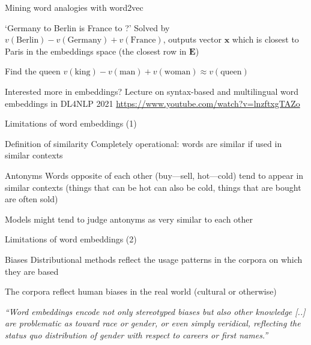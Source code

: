 \documentclass[12pt,aspectratio=169,handout]{beamer}
\begin{document}
\begin{frame}{Mining word analogies with word2vec}

\begin{block}{`Germany to Berlin is France to ?'}
Solved by $v(\text{Berlin}) - v(\text{Germany}) + v(\text{France})$, outputs vector $\bm{x}$ which is closest to Paris in the embeddings space (the closest row in $\bm{E}$)
\end{block}

\begin{block}{Find the queen}
$v(\text{king}) - v(\text{man}) + v(\text{woman}) \approx v(\text{queen})$
\end{block}

Interested more in embeddings? Lecture on syntax-based and multilingual word embeddings in DL4NLP 2021 \url{https://www.youtube.com/watch?v=lnzftxgTAZo}

\end{frame}

\begin{frame}{Limitations of word embeddings (1)}

\begin{block}{Definition of similarity}
Completely operational: words are similar if used in similar contexts
\end{block}

\begin{block}{Antonyms}
Words opposite of each other (buy---sell, hot---cold) tend to appear in similar contexts (things that can be hot can also be cold, things that are bought are often sold)

Models might tend to judge antonyms as very similar to each other
\end{block}

\end{frame}

\begin{frame}{Limitations of word embeddings (2)}

\begin{block}{Biases}
Distributional methods reflect the usage patterns in the corpora on which they are based

The corpora reflect human biases in the real world (cultural or otherwise)
	
\emph{``Word embeddings encode not only stereotyped biases but also other knowledge
[..] are problematic as toward race or gender, or even simply veridical, reflecting the status quo distribution of gender with respect to careers or first names.''}
\end{block}



	
\end{frame}
\end{document}
